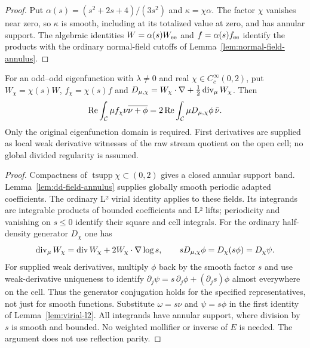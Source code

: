 \begin{proof}
\leanok
Put $\alpha(s)=(s^2+2s+4)/(3s^2)$ and $\kappa=\chi\alpha$.
The factor $\chi$ vanishes near zero, so $\kappa$ is smooth, including
at its totalized value at zero, and has annular support.
The algebraic identities $W=\alpha(s)W_{\rm ee}$ and
$f=\alpha(s)f_{\rm ee}$ identify the products with the ordinary normal-field
cutoffs of Lemma~\ref{lem:normal-field-annulus}.
\end{proof}

\begin{lemma}
\label{lem:dd-weighted-first}
\leanok
For an odd--odd eigenfunction with $\lambda\ne0$ and real
$\chi\in C_c^\infty(0,2)$, put
$W_\chi=\chi(s)W$, $f_\chi=\chi(s)f$ and
$D_{\mu,\chi}=W_\chi\cdot\nabla+\tfrac12\operatorname{div}_\mu W_\chi$. Then
\[
 \operatorname{Re}\int_{\mathcal{C}}\mu f_\chi\nu\overline{\nu+\phi}
 =2\operatorname{Re}\int_{\mathcal{C}}\mu D_{\mu,\chi}\phi\,\bar\nu.
\]
Only the original eigenfunction domain is required. First derivatives are supplied
as local weak derivative witnesses of the raw stream quotient on the open cell;
no global divided regularity is assumed.
\end{lemma}

\begin{proof}
\leanok
Compactness of $\operatorname{tsupp}\chi\subset(0,2)$ gives a closed annular
support band. Lemma~\ref{lem:dd-field-annulus} supplies globally smooth periodic
adapted coefficients. The ordinary L² virial identity applies to these fields.
Its integrands are integrable products of bounded coefficients and L² lifts;
periodicity and vanishing on $s\le0$ identify their square and cell integrals.
For the ordinary half-density generator $D_\chi$ one has
\[
 \operatorname{div}_\mu W_\chi=\operatorname{div} W_\chi+2W_\chi\cdot\nabla\log s,
 \qquad sD_{\mu,\chi}\phi=D_\chi(s\phi)=D_\chi\psi.
\]
For supplied weak derivatives, multiply $\phi$ back by the smooth
factor $s$ and use weak-derivative uniqueness to identify
$\partial_j\psi=s\,\partial_j\phi+(\partial_js)\phi$ almost everywhere
on the cell. Thus the generator conjugation holds for the specified
representatives, not just for smooth functions.
Substitute $\omega=s\nu$ and $\psi=s\phi$ in the first identity of
Lemma~\ref{lem:virial-l2}. All integrands have annular support, where division
by $s$ is smooth and bounded. No weighted mollifier or inverse of $E$ is
needed. The argument does not use reflection parity.
\end{proof}

